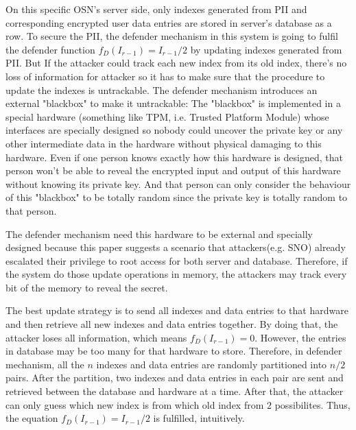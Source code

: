 \documentclass[10pt, conference, compsocconf]{IEEEtran}
\begin{document}
		On this specific OSN's server side, only indexes generated from PII and corresponding 
		encrypted user data entries are stored in server's database as a row.
		To secure the PII,
        the defender mechanism in this system is going to fulfil the defender
        function $f_D(I_{r-1}) = I_{r-1}/2$ by updating indexes generated from PII.
        But If the attacker
        could track each new index from its old index, there's no loss of information
        for attacker so it has to make sure that the procedure to update the indexes
        is untrackable.
        The defender mechanism introduces an external "blackbox" to make it untrackable:
		The "blackbox" is implemented in a special hardware (something
        like TPM, i.e. Trusted Platform Module) whose interfaces are
        specially designed so nobody could uncover the private key or any other
        intermediate data in the hardware without physical damaging to this hardware.
        Even if one person knows exactly how this hardware is designed, that person won't
        be able to reveal the encrypted input and output of this hardware without knowing
        its private key. And that person
        can only consider the behaviour of this "blackbox" to be totally random since
        the private key is totally random to that person.
        
        The defender mechanism need this hardware to be external and specially designed because
        this paper suggests a scenario that attackers(e.g. SNO) already
        escalated their privilege to root access for
        both server and database. Therefore, if the system do those update operations
        in memory, the attackers may track every bit of the memory to reveal the secret.

        The best update strategy
        is to send all indexes and data entries to that hardware and then
        retrieve all new indexes and data entries together. By doing that, the attacker
        loses all information, which means $f_D(I_{r-1}) = 0$. However, the entries
        in database may be too many for that hardware to store. Therefore, in defender mechanism,
        all the $n$ indexes and data entries are randomly partitioned into
        $n/2$ pairs.
        After the partition,
        two indexes and data entries in each pair are sent and retrieved
        between the database and hardware at a time. After that, the attacker can
        only guess which new index is from which old index from $2$ possibilites.
        Thus, the equation $f_D(I_{r-1}) = I_{r-1}/2$ is fulfilled, intuitively.
\end{document}
